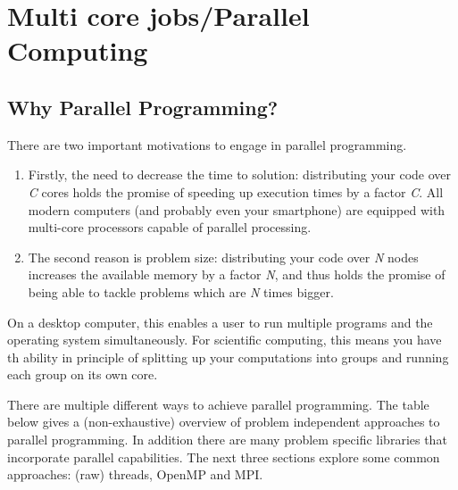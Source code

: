 \chapter{Multi core jobs/Parallel Computing}

\section{Why Parallel Programming?}

There are two important motivations to engage in parallel programming.

\begin{enumerate}

\item  Firstly, the need to decrease the time to solution: distributing your
  code over \emph{C} cores holds the promise of speeding up execution times
  by a factor \emph{C}. All modern computers (and probably even your
  smartphone) are equipped with multi-core processors capable of parallel
  processing.
\item  The second reason is problem size: distributing your code over
  \emph{N} nodes increases the available memory by a factor \emph{N}, and
  thus holds the promise of being able to tackle problems which are \emph{N}
  times bigger.
\end{enumerate}

On a desktop computer, this enables a user to run multiple programs and the
operating system simultaneously. For scientific computing, this means you have
th ability in principle of splitting up your computations into groups and
running each group on its own core.

There are multiple different ways to achieve parallel programming. The table
below gives a (non-exhaustive) overview of problem independent approaches to
parallel programming. In addition there are many problem specific libraries
that incorporate parallel capabilities. The next three sections explore some
common approaches: (raw) threads, OpenMP and MPI.

